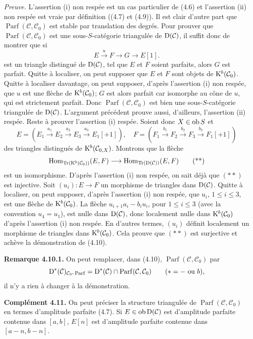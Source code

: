 \documentclass[11pt]{article}
\newcommand{\Parf}{\operatorname{Parf}}
\begin{document}
\emph{Preuve.} L'assertion (i) non respée est un cas particulier de (4.6) et l'assertion (ii) non respée est vraie par définition ((4.7) et (4.9)). Il est clair d'autre part que \(\Parf(\mathcal C,\mathcal C_0)\) est stable par translation des degrés. Pour prouver que \(\Parf(\mathcal C,\mathcal C_0)\) est une sous-\(S\)-catégorie triangulée de \(\mathrm D(\mathcal C)\), il suffit donc de montrer que si
\[
  E\xrightarrow{u}F\longrightarrow G\longrightarrow E[1].
  \tag{*}
\]
est un triangle distingué de \(\mathrm D(\mathcal C)\), tel que \(E\) et \(F\) soient parfaits, alors \(G\) est parfait. Quitte à localiser, on peut supposer que \(E\) et \(F\) sont objets de \(\mathrm K^b(\mathcal C_0)\). Quitte à localiser davantage, on peut supposer, d'après l'assertion (i) non respée, que \(u\) est une flèche de \(\mathrm K^b(\mathcal C_0)\); \(G\) est alors parfait car isomorphe au cône de \(u\), qui est strictement parfait. Donc \(\Parf(\mathcal C,\mathcal C_0)\) est bien une sous-\(S\)-catégorie triangulée de \(\mathrm D(\mathcal C)\). L'argument précédent prouve aussi, d'ailleurs, l'assertion (ii) respée. Reste à prouver l'assertion (i) respée. Soient donc \(X\in\operatorname{ob} S\) et
\[
E=(E_1\xrightarrow{a_1}E_2\xrightarrow{a_2}E_3\xrightarrow{a_3}E_1[+1]),
\quad
F=(F_1\xrightarrow{b_1}F_2\xrightarrow{b_2}F_3\xrightarrow{b_3}F_1[+1])
\]
des triangles distingués de \(\mathrm K^b(\mathcal C_{0,X})\). Montrons que la flèche
\[
  \operatorname{Hom}_{\operatorname{Tr}(\mathrm K^b(\mathcal C_0))}(E,F)
  \longrightarrow
  \operatorname{Hom}_{\operatorname{Tr}(\mathrm D(\mathcal C))}(E,F)
  \tag{**}
\]
est un isomorphisme. D'après l'assertion (i) non respée, on sait déjà que \((**)\) est injective. Soit \((u_i):E\to F\) un morphisme de triangles dans \(\mathrm D(\mathcal C)\). Quitte à localiser, on peut supposer, d'après l'assertion (i) non respée, que \(u_i\), \(1\leq i\leq3\), est une flèche de \(\mathrm K^b(\mathcal C_0)\). La flèche \(u_{i+1}a_i-b_iu_i\), pour \(1\leq i\leq3\) (avec la convention \(u_4=u_1\)), est nulle dans \(\mathrm D(\mathcal C)\), donc localement nulle dans \(\mathrm K^b(\mathcal C_0)\) d'après l'assertion (i) non respée. En d'autres termes, \((u_i)\) définit localement un morphisme de triangles dans \(\mathrm K^b(\mathcal C_0)\). Cela prouve que \((**)\) est surjective et achève la démonstration de (4.10).

\textbf{Remarque 4.10.1.} On peut remplacer, dans (4.10), \(\Parf(\mathcal C,\mathcal C_0)\) par
\[
  \Dpx^*(\mathcal C)_{\mathcal C_0\text{-}\Parf}
  =\Dpx^*(\mathcal C)\cap\Parf(\mathcal C,\mathcal C_0)
  \qquad(*=-\text{ ou }b),
\]
il n'y a rien à changer à la démonstration.

\textbf{Complément 4.11.} On peut préciser la structure triangulée de \(\Parf(\mathcal C,\mathcal C_0)\) en termes d'amplitude parfaite (4.7). Si \(E\in\operatorname{ob}\mathrm D(\mathcal C)\) est d'amplitude parfaite contenue dans \([a,b]\), \(E[n]\) est d'amplitude parfaite contenue dans \([a-n,b-n]\).
\end{document}

